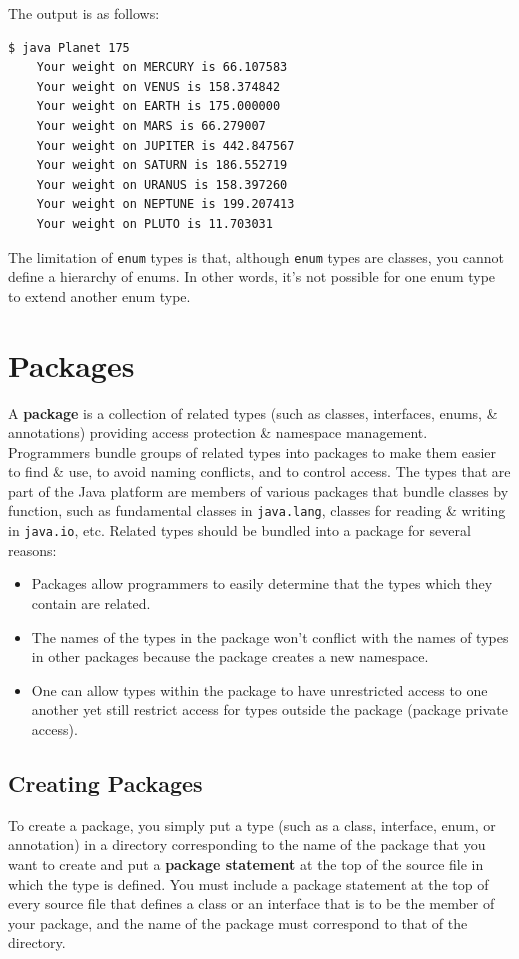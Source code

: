 \documentclass[a4paper,11pt]{article}
\begin{document}
The output is as follows:
\begin{verbatim}
$ java Planet 175
    Your weight on MERCURY is 66.107583
    Your weight on VENUS is 158.374842
    Your weight on EARTH is 175.000000
    Your weight on MARS is 66.279007
    Your weight on JUPITER is 442.847567
    Your weight on SATURN is 186.552719
    Your weight on URANUS is 158.397260
    Your weight on NEPTUNE is 199.207413
    Your weight on PLUTO is 11.703031
\end{verbatim}

The limitation of \verb|enum| types is that, although \verb|enum| types are classes, you cannot define a hierarchy of enums. 
In other words, it's not possible for one enum type to extend another enum type.

\section{Packages}
A \textbf{package} is a collection of related types (such as classes, interfaces, enums, \& annotations) providing access
protection \& namespace management.
Programmers bundle groups of related types into packages to make them easier to find \& use, to avoid naming 
conflicts, and to control access.
The types that are part of the Java platform are members of various packages that bundle classes by function, such as 
fundamental classes in \verb|java.lang|, classes for reading \& writing in \verb|java.io|, etc.
Related types should be bundled into a package for several reasons:
\begin{itemize}
    \item   Packages allow programmers to easily determine that the types which they contain are related.
    \item   The names of the types in the package won't conflict with the names of types in other packages because the 
            package creates a new namespace.
    \item   One can allow types within the package to have unrestricted access to one another yet still restrict access for 
            types outside the package (package private access).
\end{itemize}

\subsection{Creating Packages}
To create a package, you simply put a type (such as a class, interface, enum, or annotation) in a directory corresponding
to the name of the package that you want to create and put a \textbf{package statement} at the top of the source file in
which the type is defined.
You must include a package statement at the top of every source file that defines a class or an interface that is to be the 
member of your package, and the name of the package must correspond to that of the directory.
\end{document}
